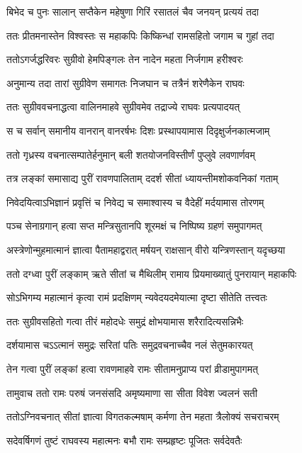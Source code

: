 \twolineshloka
{बिभेद च पुनः सालान् सप्तैकेन महेषुणा}
{गिरिं रसातलं चैव जनयन् प्रत्ययं तदा}%

\twolineshloka
{ततः प्रीतमनास्तेन विश्वस्तः स महाकपिः}
{किष्किन्धां रामसहितो जगाम च गुहां तदा}%

\twolineshloka
{ततोऽगर्जद्धरिवरः सुग्रीवो हेमपिङ्गलः}
{तेन नादेन महता निर्जगाम हरीश्वरः}%

\twolineshloka
{अनुमान्य तदा तारां सुग्रीवेण समागतः}
{निजघान च तत्रैनं शरेणैकेन राघवः}%

\twolineshloka
{ततः सुग्रीववचनाद्धत्वा वालिनमाहवे}
{सुग्रीवमेव तद्राज्ये राघवः प्रत्यपादयत्}%

\twolineshloka
{स च सर्वान् समानीय वानरान् वानरर्षभः}
{दिशः प्रस्थापयामास दिदृक्षुर्जनकात्मजाम्}%

\twolineshloka
{ततो गृध्रस्य वचनात्सम्पातेर्हनुमान् बली}
{शतयोजनविस्तीर्णं पुप्लुवे लवणार्णवम्}%

\twolineshloka
{तत्र लङ्कां समासाद्य पुरीं रावणपालिताम्}
{ददर्श सीतां ध्यायन्तीमशोकवनिकां गताम्}%

\twolineshloka
{निवेदयित्वाऽभिज्ञानं प्रवृत्तिं च निवेद्य च}
{समाश्वास्य च वैदेहीं मर्दयामास तोरणम्}%

\twolineshloka
{पञ्च सेनाग्रगान् हत्वा सप्त मन्त्रिसुतानपि}
{शूरमक्षं च निष्पिष्य ग्रहणं समुपागमत्}%

\twolineshloka
{अस्त्रेणोन्मुहमात्मानं ज्ञात्वा पैतामहाद्वरात्}
{मर्षयन् राक्षसान् वीरो यन्त्रिणस्तान् यदृच्छया}%

\twolineshloka
{ततो दग्ध्वा पुरीं लङ्काम् ऋते सीतां च मैथिलीम्}
{रामाय प्रियमाख्यातुं पुनरायान् महाकपिः}%

\twolineshloka
{सोऽभिगम्य महात्मानं कृत्वा रामं प्रदक्षिणम्}
{न्यवेदयदमेयात्मा दृष्टा सीतेति तत्त्वतः}%

\twolineshloka
{ततः सुग्रीवसहितो गत्वा तीरं महोदधेः}
{समुद्रं क्षोभयामास शरैरादित्यसन्निभैः}%

\twolineshloka
{दर्शयामास चऽऽत्मानं समुद्रः सरितां पतिः}
{समुद्रवचनाच्चैव नलं सेतुमकारयत्}%

\twolineshloka
{तेन गत्वा पुरीं लङ्कां हत्वा रावणमाहवे}
{रामः सीतामनुप्राप्य परां व्रीडामुपागमत्}%

\twolineshloka
{तामुवाच ततो रामः परुषं जनसंसदि}
{अमृष्यमाणा सा सीता विवेश ज्वलनं सती}%

\twolineshloka
{ततोऽग्निवचनात् सीतां ज्ञात्वा विगतकल्मषाम्}
{कर्मणा तेन महता त्रैलोक्यं सचराचरम्}%

\twolineshloka
{सदेवर्षिगणं तुष्टं राघवस्य महात्मनः}
{बभौ रामः सम्प्रहृष्टः पूजितः सर्वदेवतैः}%

